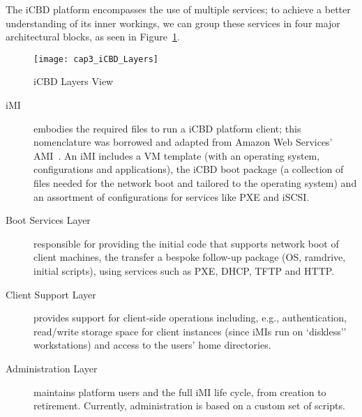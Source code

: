 
The iCBD platform encompasses the use of multiple services; to achieve a better understanding of its inner workings, we can group these services in four major architectural blocks, as seen in Figure~\ref{fig:icbd_layers}.


\begin{figure}[htbp]
	\centering
	\texttt{[image: cap3\_iCBD\_Layers]}
	\caption{iCBD Layers View}
	\label{fig:icbd_layers}
\end{figure}


\begin{description}
	\item [\acrfull{iMI}] embodies the required files to run a iCBD platform client; this nomenclature was borrowed and adapted from Amazon Web Services’ AMI~\cite{aws_ami}. An iMI includes a VM template (with an operating system, configurations and applications), the iCBD boot package (a collection of files needed for the network boot and tailored to the operating system) and an assortment of configurations for services like PXE and iSCSI.
	\item [Boot Services Layer] responsible for providing the initial code that supports network boot of client machines, the transfer a bespoke follow-up package (OS, ramdrive, initial scripts), using services such as \acrshort{PXE}, \acrshort{DHCP}, \acrshort{TFTP} and \acrshort{HTTP}.
	\item [Client Support Layer] provides support for client-side operations including, e.g., authentication, read/write storage space for client instances (since iMIs run on `diskless'' workstations) and access to the users' home directories.
	\item [Administration Layer] maintains platform users and the full iMI life cycle, from creation to retirement. Currently, administration is based on a custom set of scripts.

\end{description}
